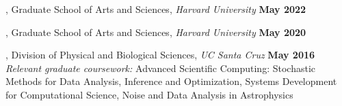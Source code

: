 , Graduate School of Arts and Sciences, \textit{Harvard University} \hfill \textbf{May 2022}

%

, Graduate School of Arts and Sciences, \textit{Harvard University} \hfill \textbf{May 2020}

, Division of Physical and Biological Sciences, \textit{UC Santa Cruz} \hfill \textbf{May 2016} \\ %

\vspace{0.25em}
\textit{Relevant graduate coursework:} Advanced Scientific Computing: Stochastic Methods for Data Analysis, Inference and Optimization, Systems Development for Computational Science, Noise and Data Analysis in Astrophysics